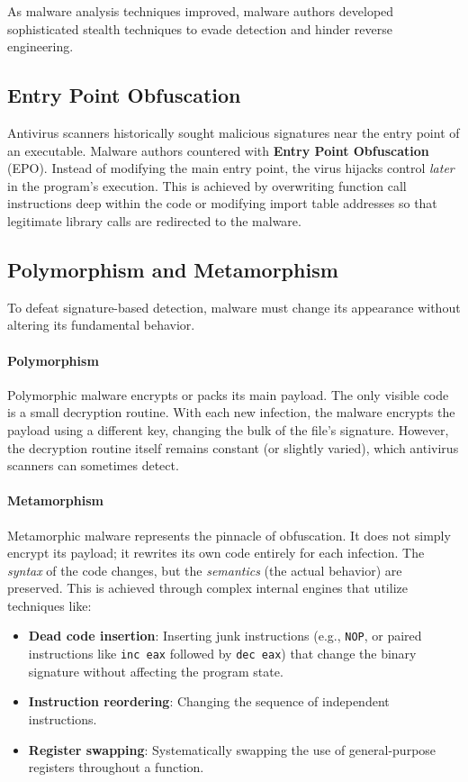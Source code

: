 As malware analysis techniques improved, malware authors developed sophisticated stealth techniques to evade detection and hinder reverse engineering.

\subsection{Entry Point Obfuscation}
Antivirus scanners historically sought malicious signatures near the entry point of an executable. Malware authors countered with \textbf{Entry Point Obfuscation} (EPO). Instead of modifying the main entry point, the virus hijacks control \textit{later} in the program's execution. This is achieved by overwriting function call instructions deep within the code or modifying import table addresses so that legitimate library calls are redirected to the malware.

\subsection{Polymorphism and Metamorphism}
To defeat signature-based detection, malware must change its appearance without altering its fundamental behavior.

\paragraph{Polymorphism}
Polymorphic malware encrypts or packs its main payload. The only visible code is a small decryption routine. With each new infection, the malware encrypts the payload using a different key, changing the bulk of the file's signature. However, the decryption routine itself remains constant (or slightly varied), which antivirus scanners can sometimes detect.

\paragraph{Metamorphism}
Metamorphic malware represents the pinnacle of obfuscation. It does not simply encrypt its payload; it rewrites its own code entirely for each infection. The \textit{syntax} of the code changes, but the \textit{semantics} (the actual behavior) are preserved. This is achieved through complex internal engines that utilize techniques like:
\begin{itemize}
    \item \textbf{Dead code insertion}: Inserting junk instructions (e.g., \texttt{NOP}, or paired instructions like \texttt{inc eax} followed by \texttt{dec eax}) that change the binary signature without affecting the program state.
    \item \textbf{Instruction reordering}: Changing the sequence of independent instructions.
    \item \textbf{Register swapping}: Systematically swapping the use of general-purpose registers throughout a function.
\end{itemize}

